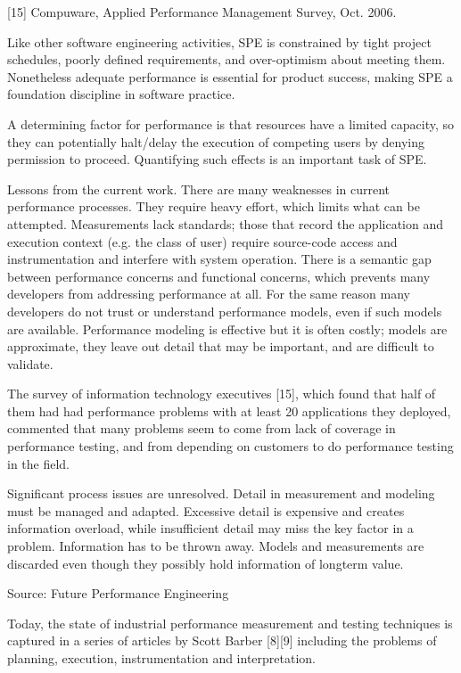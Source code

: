 \documentclass[runningheads,a4paper]{llncs}
\begin{document}
[15] Compuware, Applied Performance Management Survey, Oct. 2006.

Like other software engineering activities, SPE is
constrained by tight project schedules, poorly defined
requirements, and over-optimism about meeting them.
Nonetheless adequate performance is essential for
product success, making SPE a foundation discipline in
software practice.

A determining factor for performance is that
resources have a limited capacity, so they can
potentially halt/delay the execution of competing users
by denying permission to proceed. Quantifying such
effects is an important task of SPE.

Lessons from the current work. There are many
weaknesses in current performance processes. They
require heavy effort, which limits what can be
attempted. Measurements lack standards; those that
record the application and execution context (e.g. the
class of user) require source-code access and
instrumentation and interfere with system operation.
There is a semantic gap between performance concerns
and functional concerns, which prevents many
developers from addressing performance at all. For the
same reason many developers do not trust or
understand performance models, even if such models
are available. Performance modeling is effective but it
is often costly; models are approximate, they leave out
detail that may be important, and are difficult to
validate.

The survey of information technology executives
[15], which found that half of them had had
performance problems with at least 20%
applications they deployed, commented that many
problems seem to come from lack of coverage in
performance testing, and from depending on customers
to do performance testing in the field.

Significant process issues are unresolved. Detail in
measurement and modeling must be managed and
adapted. Excessive detail is expensive and creates
information overload, while insufficient detail may
miss the key factor in a problem. Information has to be
thrown away. Models and measurements are discarded
even though they possibly hold information of longterm
value.

Source: Future Performance Engineering

Today, the state of industrial
performance measurement and testing techniques is
captured in a series of articles by Scott Barber [8][9]
including the problems of planning, execution,
instrumentation and interpretation.
\end{document}
